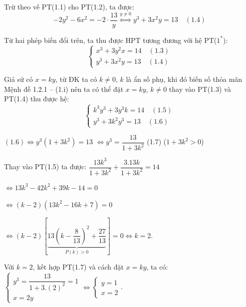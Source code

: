\documentclass[12pt]{report}
\begin{document}
\vspace{0.2cm}
\noindent Trừ theo vế PT(1.1) cho PT(1.2), ta được:
\[
-2y^2 - 6x^2 = -2 \cdot \dfrac{13}{y} \overset{y \neq 0}{\Leftrightarrow} y^3 + 3x^2y = 13 \quad (1.4)
\]

\vspace{0.2cm}
\noindent Từ hai phép biến đổi trên, ta thu được HPT tương đương với hệ PT($1^*$):
\[
\begin{cases}
x^3 + 3y^2x = 14 \quad (1.3) \\
y^3 + 3x^2y = 13 \quad (1.4)
\end{cases}
\]

\vspace{0.2cm}
\noindent Giả sử có $x = ky$, từ ĐK ta có $k \neq 0$, $k$ là ẩn số phụ, khi đó biến số thỏa mãn Mệnh đề 1.2.1 -- (1.i) nên ta có thể đặt $x = ky$, $k \neq 0$ thay vào PT(1.3) và PT(1.4) thu được hệ:
\[
\begin{cases}
k^3y^3 + 3y^3k = 14 \quad (1.5) \\
y^3 + 3k^2y^3 = 13 \quad (1.6)
\end{cases}
\]

\vspace{0.2cm}
\noindent $(1.6) \Leftrightarrow y^3(1 + 3k^2) = 13$
\noindent $\Leftrightarrow y^3 = \dfrac{13}{1 + 3k^2}$ (1.7) ($1 + 3k^2 > 0$)

\vspace{0.2cm}
\noindent Thay vào PT(1.5) ta được: $\dfrac{13k^3}{1 + 3k^2} + \dfrac{3.13k}{1 + 3k^2} = 14$

\vspace{0.2cm}
\noindent $\Leftrightarrow 13k^3 - 42k^2 + 39k - 14 = 0$

\vspace{0.2cm}
\noindent $\Leftrightarrow (k - 2)(13k^2 - 16k + 7) = 0$

\vspace{0.2cm}
\noindent $\Leftrightarrow (k - 2) \left[ \underbrace{13\left(k - \dfrac{8}{13}\right)^2 + \dfrac{27}{13}}_{P(k) > 0} \right] = 0 \Leftrightarrow k = 2$.

\vspace{0.3cm}
\noindent Với $k = 2$, kết hợp PT(1.7) và cách đặt $x = ky$, ta có: $\begin{cases} y^3 = \dfrac{13}{1 + 3.(2)^2} = 1 \\ x = 2y \end{cases} \Leftrightarrow \begin{cases} y = 1 \\ x = 2 \end{cases}$.
\end{document}
